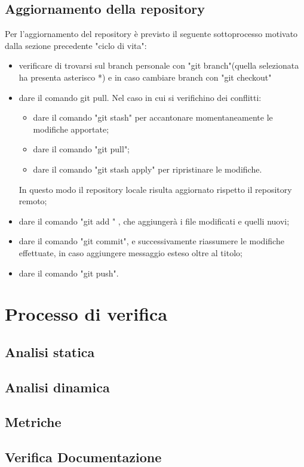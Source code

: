 \documentclass[NormeDiProgetto.tex]{subfiles}
\begin{document}
	\subsection{Aggiornamento della repository}
	Per l’aggiornamento del repository è previsto il seguente sottoprocesso motivato dalla sezione precedente "ciclo di vita":
	\begin{itemize}
		\item verificare di trovarsi sul branch personale con "git branch"(quella selezionata ha presenta asterisco *) e in caso cambiare branch con "git checkout"
		\item dare il comando git pull. Nel caso in cui si verifichino dei conflitti:
		\begin{itemize}
			\item dare il comando "git stash" per accantonare momentaneamente	le modifiche apportate;
			\item dare il comando "git pull";
			\item dare il comando "git stash apply" per ripristinare le modifiche.
		\end{itemize}	In questo modo il repository locale risulta aggiornato rispetto il repository remoto;
	
		\item dare il comando "git add \textasteriskcentered" , che aggiungerà i file modificati e quelli nuovi;
		\item dare il comando "git commit", e successivamente riassumere le modifiche effettuate, in caso aggiungere messaggio esteso oltre al titolo;
		\item dare il comando "git push".
	\end{itemize}
	
	\section{Processo di verifica}
	\subsection{Analisi statica}
	\subsection{Analisi dinamica}
	\subsection{Metriche}
	
	\subsection{Verifica Documentazione}
\end{document}
